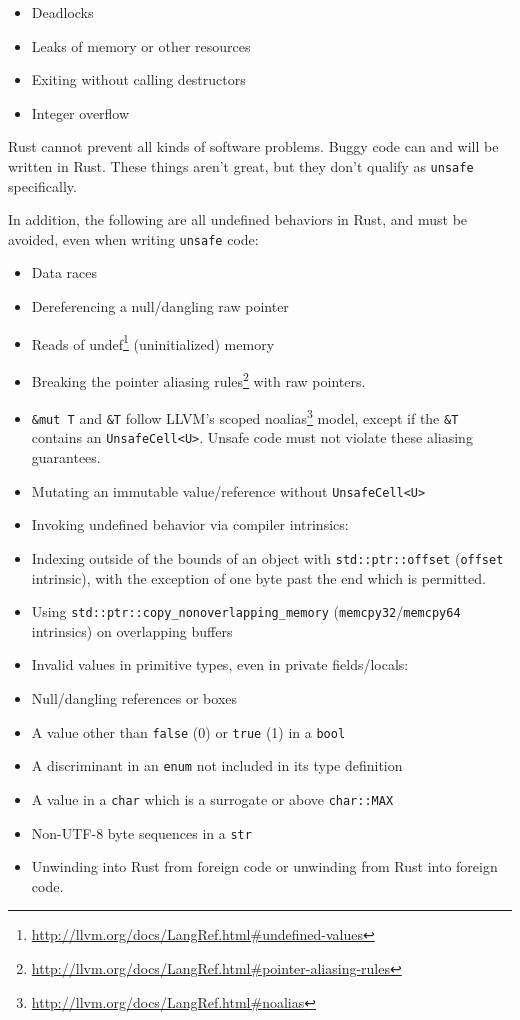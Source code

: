 \documentclass[a4paper,]{book}
\renewcommand{\href}[2]{#2\footnote{\url{#1}}}
\providecommand{\tightlist}{%
  \setlength{\itemsep}{0pt}\setlength{\parskip}{0pt}}
\begin{document}
\begin{itemize}
\tightlist
\item
  Deadlocks
\item
  Leaks of memory or other resources
\item
  Exiting without calling destructors
\item
  Integer overflow
\end{itemize}

Rust cannot prevent all kinds of software problems. Buggy code can and
will be written in Rust. These things aren't great, but they don't
qualify as \texttt{unsafe} specifically.

In addition, the following are all undefined behaviors in Rust, and must
be avoided, even when writing \texttt{unsafe} code:

\begin{itemize}
\tightlist
\item
  Data races
\item
  Dereferencing a null/dangling raw pointer
\item
  Reads of
  \href{http://llvm.org/docs/LangRef.html\#undefined-values}{undef}
  (uninitialized) memory
\item
  Breaking the
  \href{http://llvm.org/docs/LangRef.html\#pointer-aliasing-rules}{pointer
  aliasing rules} with raw pointers.
\item
  \texttt{\&mut\ T} and \texttt{\&T} follow LLVM's scoped
  \href{http://llvm.org/docs/LangRef.html\#noalias}{noalias} model,
  except if the \texttt{\&T} contains an
  \texttt{UnsafeCell\textless{}U\textgreater{}}. Unsafe code must not
  violate these aliasing guarantees.
\item
  Mutating an immutable value/reference without
  \texttt{UnsafeCell\textless{}U\textgreater{}}
\item
  Invoking undefined behavior via compiler intrinsics:
\item
  Indexing outside of the bounds of an object with
  \texttt{std::ptr::offset} (\texttt{offset} intrinsic), with the
  exception of one byte past the end which is permitted.
\item
  Using \texttt{std::ptr::copy\_nonoverlapping\_memory}
  (\texttt{memcpy32}/\texttt{memcpy64} intrinsics) on overlapping
  buffers
\item
  Invalid values in primitive types, even in private fields/locals:
\item
  Null/dangling references or boxes
\item
  A value other than \texttt{false} (0) or \texttt{true} (1) in a
  \texttt{bool}
\item
  A discriminant in an \texttt{enum} not included in its type definition
\item
  A value in a \texttt{char} which is a surrogate or above
  \texttt{char::MAX}
\item
  Non-UTF-8 byte sequences in a \texttt{str}
\item
  Unwinding into Rust from foreign code or unwinding from Rust into
  foreign code.
\end{itemize}
\end{document}
